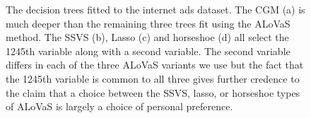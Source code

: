 \begin{figure}[H]
\begin{center}
\begin{tabular}{cc}
    \end{tabular}
\caption{The  decision trees fitted to the internet ads dataset. The CGM (a) is much deeper than the remaining three trees fit using the ALoVaS method. The SSVS (b), Lasso (c) and horseshoe (d) all select the 1245th variable along with a second variable. The second variable differs in each of the three ALoVaS variants we use but the fact that the 1245th variable is common to all three gives further credence to the claim that a choice between the SSVS, lasso, or horseshoe types of ALoVaS is largely a choice of personal preference. }
\label{fig:unbalanced_study_results_trees}
\end{center}
\end{figure}
	
	
%
%
%
%
%		
